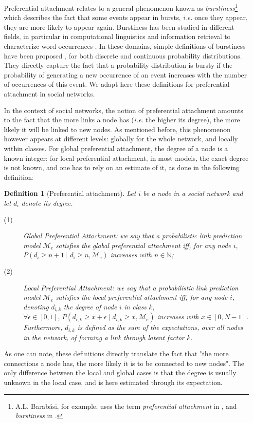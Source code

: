 \documentclass[journal]{IEEEtran}
\newcommand{\pr}{P}
\newtheorem{definition}{Definition}[section]
\begin{document}
Preferential attachment relates to a general phenomenon known as \textit{burstiness}\footnote{A.L. Barab\'asi, for example, uses the term \textit{preferential attachment} in \cite{barabasi1999emergence}, and \textit{burstiness} in \cite{barabasi_burst}.} which describes the fact that some events appear in bursts, \textit{i.e.} once they appear, they are more likely to appear again. Burstiness has been studied in different fields, in particular in computational linguistics and information retrieval to characterize word occurrences \cite{church1995poisson}. In these domains, simple definitions of burstiness have been proposed \cite{clinchant2008bnb,clinchant2010information}, for both discrete and continuous probability distributions. They directly capture the fact that a probability distribution is bursty if the probability of generating a new occurrence of an event increases with the number of occurrences of this event. We adapt here these definitions for preferential attachment in social networks.

In the context of social networks, the notion of preferential attachment amounts to the fact that the more links a node has (\textit{i.e.} the higher its degree), the more likely it will be linked to new nodes. As mentioned before, this phenomenon however appears at different levels: globally for the whole network, and locally within classes. For global preferential attachment, the degree of a node is a known integer; for local preferential attachment, in most models, the exact degree is not known, and one has to rely on an estimate of it, as done in the following definition:
%
\begin{definition}[Preferential attachment]
Let $i$ be a node in a social network and let $d_i$ denote its degree. 
\begin{description}
 \item[(1)] \emph{Global Preferential Attachment}: we say that a probabilistic link prediction model $\mathcal{M}_e$ satisfies the global preferential attachment iff, for any node $i$, $\pr(d_i \ge n+1 \mid d_i \ge n, \mathcal{M}_e)$ increases with $n \in \mathbb{N}$;
 \item[(2)] \emph{Local Preferential Attachment}: we say that a probabilistic link prediction model $\mathcal{M}_e$ satisfies the local preferential attachment iff, for any node $i$, denoting $d_{i,k}$ the degree of node $i$ in class $k$, $\forall \epsilon \in [0,1], \, \pr(d_{i,k} \ge x+\epsilon \mid d_{i,k} \ge x, \mathcal{M}_e)$ increases with $x \in [0,N-1]$. Furthermore, $d_{i,k}$ is defined as the sum of the expectations, over all nodes in the network, of forming a link through latent factor $k$.
\end{description}
\label{def:burst-soc-net}
\end{definition}
%
As one can note, these definitions directly translate the fact that "the more connections a node has, the more likely it is to be connected to new nodes". The only difference between the local and global cases is that the degree is usually unknown in the local case, and is here estimated through its expectation.
\end{document}
